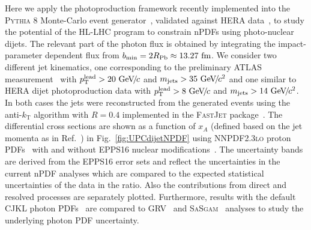 \documentclass[../report.tex]{subfiles}
\begin{document}
Here we apply the photoproduction framework recently implemented into the \textsc{Pythia 8} Monte-Carlo event generator~\cite{Sjostrand:2014zea}, validated against HERA data~\cite{Helenius:2018bai}, to study the potential of the HL-LHC program to constrain nPDFs using photo-nuclear dijets. The relevant part of the photon flux is obtained by integrating the impact-parameter dependent flux from $b_{\mathrm{min}}=2 R_{\mathrm{Pb}} \approx 13.27~\text{fm}$. We consider two different jet kinematics, one corresponding to the preliminary ATLAS measurement~\cite{ATLAS:2017kwa} with $p\sb{\scriptstyle\mathrm{T}}^{\mathrm{lead}}>20~\text{GeV}\!/\mspace{-2mu}c$ and $m_{\mathrm{jets}} > 35~\text{GeV}\!/\mspace{-2mu}c^2$ and one similar to HERA dijet photoproduction data with $p\sb{\scriptstyle\mathrm{T}}^{\mathrm{lead}}>8~\text{GeV}\!/\mspace{-2mu}c$ and $m_{\mathrm{jets}} > 14~\text{GeV}\!/\mspace{-2mu}c^2$. In both cases the jets were reconstructed from the generated events using the anti-$k_{\mathrm{T}}$ algorithm with $R = 0.4$ implemented in the \textsc{FastJet} package~\cite{Cacciari:2011ma}. The differential cross sections are shown as a function of $x_A$ (defined based on the jet momenta as in Ref.~\cite{ATLAS:2017kwa}) in Fig.~\ref{fig:UPCdijetNPDF} using \textsc{NNPDF2.3lo} proton PDFs~\cite{Ball:2012cx} with and without EPPS16 nuclear modifications~\cite{Eskola:2016oht}. The uncertainty bands are derived from the EPPS16 error sets and reflect the uncertainties in the current nPDF analyses which are compared to the expected statistical uncertainties of the data in the ratio. Also the contributions from direct and resolved processes are separately plotted. Furthermore, results with the default CJKL photon PDFs~\cite{Cornet:2002iy} are compared to GRV~\cite{Gluck:1991jc} and \textsc{SaSgam}~\cite{Schuler:1995fk} analyses to study the underlying photon PDF uncertainty.
\end{document}
